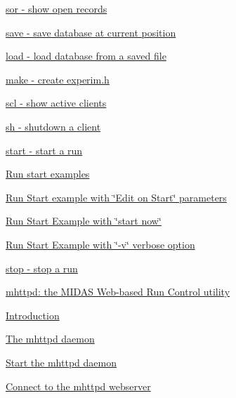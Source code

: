 \begin{TabularC}{2}
\begin{TabularC}{2}
\begin{DoxyItemize}
\begin{DoxyItemize}
\begin{DoxyItemize}
\begin{DoxyItemize}
\begin{DoxyItemize}
\item \hyperlink{RC_odbedit_examples_RC_odbedit_sor}{sor -\/ show open records} 
\item \hyperlink{RC_odbedit_examples_RC_odbedit_save}{save -\/ save database at current position} 
\item \hyperlink{RC_odbedit_examples_RC_odbedit_load}{load -\/ load database from a saved file} 
\item \hyperlink{RC_odbedit_examples_RC_odbedit_make}{make -\/ create experim.h} 
\item \hyperlink{RC_odbedit_examples_RC_odbedit_scl}{scl -\/ show active clients} 
\item \hyperlink{RC_odbedit_examples_RC_odbedit_sh}{sh -\/ shutdown a client} 
\item \hyperlink{RC_odbedit_examples_RC_odbedit_start}{start -\/ start a run} 
\begin{DoxyItemize}
\item \hyperlink{RC_odbedit_examples_RC_EOS_example1}{Run start examples} 
\item \hyperlink{RC_odbedit_examples_RC_EOS_example2}{Run Start example with \char`\"{}Edit on Start\char`\"{} parameters} 
\item \hyperlink{RC_odbedit_examples_RC_EOS_example3}{Run Start Example with \char`\"{}start now\char`\"{}} 
\item \hyperlink{RC_odbedit_examples_RC_EOS_example4}{Run Start Example with \char`\"{}-\/v\char`\"{} verbose option} 
\end{DoxyItemize}
\item \hyperlink{RC_odbedit_examples_RC_odbedit_stop}{stop -\/ stop a run} 
\end{DoxyItemize}
\end{DoxyItemize}
\end{DoxyItemize}
\item \hyperlink{RC_mhttpd}{mhttpd: the MIDAS Web-\/based Run Control utility} 
\begin{DoxyItemize}
\item \hyperlink{RC_mhttpd_RC_mhttpd_intro}{Introduction} 
\item \hyperlink{RC_mhttpd_utility}{The mhttpd daemon} 
\begin{DoxyItemize}
\item \hyperlink{RC_mhttpd_utility_RC_mhttpd_Usage}{Start the mhttpd daemon} 
\begin{DoxyItemize}
\item \hyperlink{RC_mhttpd_utility_RC_mhttpd_connect}{Connect to the mhttpd webserver} 

\end{DoxyItemize}
\end{DoxyItemize}
\end{DoxyItemize}
\end{DoxyItemize}
\end{DoxyItemize}
\end{TabularC}
\end{TabularC}
